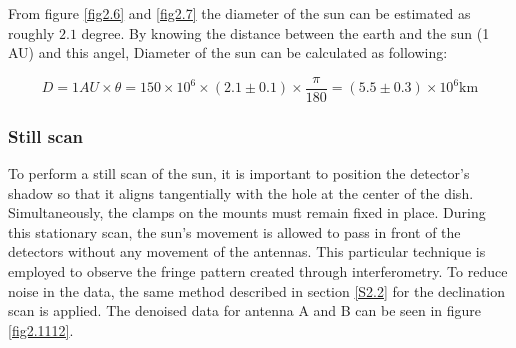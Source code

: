 \documentclass[12pt]{article}
\begin{document}
 From figure \ref{fig2.6} and \ref{fig2.7} the diameter of the sun can be estimated as roughly $2.1$ degree. By knowing the distance between the earth and the sun (1 AU) and this angel, Diameter of the sun can be calculated as following:

 \begin{equation}
 D = 1AU \times \theta = 150 \times 10^6 \times (2.1\pm 0.1) \times \dfrac{\pi}{180} = (5.5 \pm 0.3) \times 10^6 \mathrm{km} 
 \end{equation} 

 \subsubsection{Still scan}

 To perform a still scan of the sun, it is important to position the detector's shadow so that it aligns tangentially with the hole at the center of the dish. Simultaneously, the clamps on the mounts must remain fixed in place. During this stationary scan, the sun's movement is allowed to pass in front of the detectors without any movement of the antennas. This particular technique is employed to observe the fringe pattern created through interferometry. To reduce noise in the data, the same method described in section \ref{S2.2} for the declination scan is applied. The denoised data for antenna A and B can be seen in figure \ref{fig2.1112}.
\end{document}
